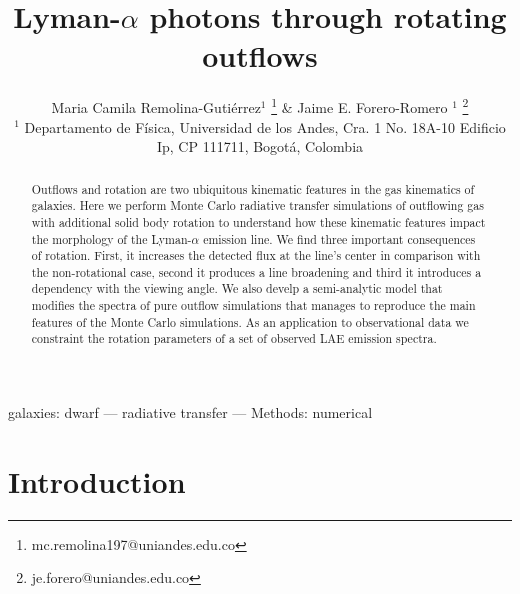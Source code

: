 \documentclass[a4paper,fleqn,usenatbib]{mnras}
\begin{document}
\title[Outflows and rotation in LAEs]{Lyman-$\alpha$ photons through rotating outflows}
\author[M.C. Remolina-Gutierrez \& J.E. Forero-Romero]{
  Maria Camila Remolina-Guti\'errez$^{1}$
  \thanks{mc.remolina197@uniandes.edu.co} \&
  Jaime E. Forero-Romero $^{1}$
  \thanks{je.forero@uniandes.edu.co}\\
  $^{1}$ Departamento de F\'isica, Universidad de los Andes, Cra. 1
  No. 18A-10 Edificio Ip, CP 111711, Bogot\'a, Colombia \\
}

\maketitle

\begin{abstract}
Outflows and rotation are two ubiquitous kinematic features in the gas
kinematics of galaxies.
Here we perform Monte Carlo radiative transfer simulations of outflowing
gas with additional solid body rotation to understand how these kinematic
features impact the morphology of the Lyman-$\alpha$ emission line.
We find three important consequences of rotation.
First, it increases the detected flux at the line's center in comparison with the
non-rotational case, second it produces a line broadening and third it introduces
a dependency with the  viewing angle.
We also develp a semi-analytic model that modifies the spectra of
pure outflow simulations that manages to reproduce the main features of the
Monte Carlo simulations.
As an application to observational data we constraint the rotation
parameters of a set of observed LAE emission spectra.    
\end{abstract}

\begin{keywords}
galaxies: dwarf --- radiative transfer --- Methods: numerical
\end{keywords}




\section{Introduction}
\label{sec:intro}
\end{document}
